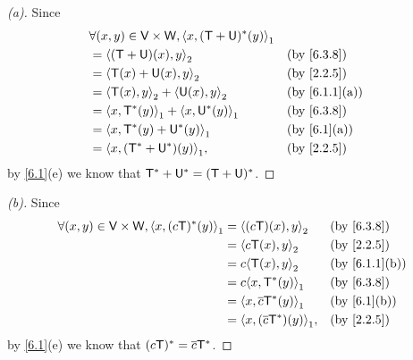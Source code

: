 \begin{proof}[(a)]
	Since
	\begin{align*}
		 & \forall (x, y) \in \V \times \W, \inn{x, (\T + \U)^*(y)}_1                    \\
		 & = \inn{(\T + \U)(x), y}_2                                  &  & \by{6.3.8}    \\
		 & = \inn{\T(x) + \U(x), y}_2                                 &  & \by{2.2.5}    \\
		 & = \inn{\T(x), y}_2 + \inn{\U(x), y}_2                      &  & \by{6.1.1}[a] \\
		 & = \inn{x, \T^*(y)}_1 + \inn{x, \U^*(y)}_1                  &  & \by{6.3.8}    \\
		 & = \inn{x, \T^*(y) + \U^*(y)}_1                             &  & \by{6.1}[a]   \\
		 & = \inn{x, (\T^* + \U^*)(y)}_1,                             &  & \by{2.2.5}
	\end{align*}
	by \cref{6.1}(e) we know that \(\mathsf{T}^* + \mathsf{U}^* = (\mathsf{T} + \mathsf{U})^*\).
\end{proof}

\begin{proof}[(b)]
	Since
	\begin{align*}
		\forall (x, y) \in \V \times \W, \inn{x, (c \T)^*(y)}_1 & = \inn{(c \T)(x), y}_2           &  & \by{6.3.8}    \\
		                                                        & = \inn{c \T(x), y}_2             &  & \by{2.2.5}    \\
		                                                        & = c \inn{\T(x), y}_2             &  & \by{6.1.1}[b] \\
		                                                        & = c \inn{x, \T^*(y)}_1           &  & \by{6.3.8}    \\
		                                                        & = \inn{x, \conj{c} \T^*(y)}_1    &  & \by{6.1}[b]   \\
		                                                        & = \inn{x, (\conj{c} \T^*)(y)}_1, &  & \by{2.2.5}
	\end{align*}
	by \cref{6.1}(e) we know that \((c \mathsf{T})^* = \overline{c} \mathsf{T}^*\).
\end{proof}

